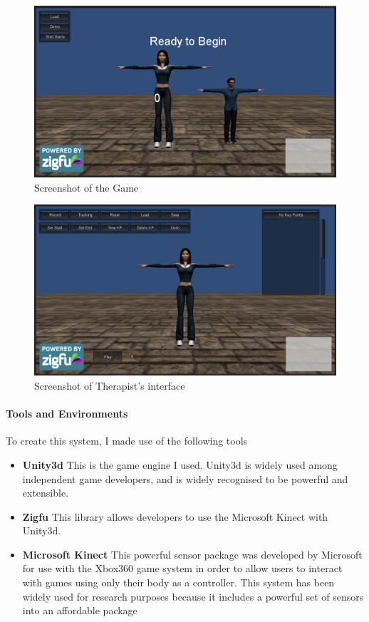 \documentclass{article}
\begin{document}
\begin{figure}[htb]
	\includegraphics[width=\linewidth]{Game.png}
	\caption{Screenshot of the Game}
	\label{Gameshot}
\end{figure}

\begin{figure}[htb]
	\includegraphics[width=\linewidth]{TherapistsInt.png}
	\caption{Screenshot of Therapist's interface}
	\label{Gameshot2}
\end{figure}

\paragraph{Tools and Environments}
To create this system, I made use of the following tools
\begin{itemize}
	\item \textbf{Unity3d} This is the game engine I used. Unity3d is widely used among independent game developers, and is widely recognised to be powerful and extensible.

	\item \textbf{Zigfu} This library allows developers to use the Microsoft Kinect with Unity3d. 

	\item \textbf{Microsoft Kinect} This powerful sensor package was developed by Microsoft for use with the Xbox360 game system in order to allow users to interact with games using only their body as a controller. This system has been widely used for research purposes because it includes a powerful set of sensors into an affordable package
\end{itemize}
\end{document}
